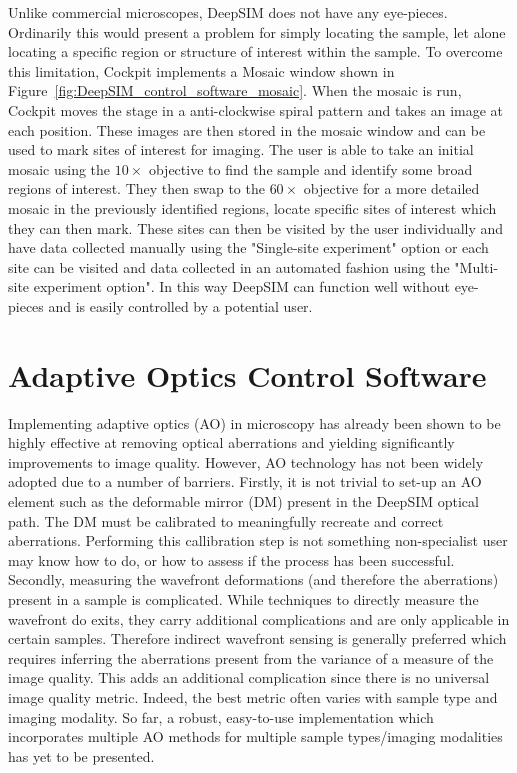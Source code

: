 Unlike commercial microscopes, DeepSIM does not have any eye-pieces. Ordinarily this would present a problem for simply locating the sample, let alone locating a specific region or structure of interest within the sample. To overcome this limitation, Cockpit implements a Mosaic window shown in Figure~\ref{fig:DeepSIM_control_software_mosaic}. When the mosaic is run, Cockpit moves the stage in a anti-clockwise spiral pattern and takes an image at each position. These images are then stored in the mosaic window and can be used to mark sites of interest for imaging. The user is able to take an initial mosaic using the $10\times$ objective to find the sample and identify some broad regions of interest. They then swap to the $60\times$ objective for a more detailed mosaic in the previously identified regions, locate specific sites of interest which they can then mark. These sites can then be visited by the user individually and have data collected manually using the "Single-site experiment" option or each site can be visited and data collected in an automated fashion using the "Multi-site experiment option". In this way DeepSIM can function well without eye-pieces and is easily controlled by a potential user.

\section{Adaptive Optics Control Software}
\label{sec:AOtools}

Implementing adaptive optics (AO) in microscopy has already been shown to be highly effective at removing optical aberrations and yielding significantly improvements to image quality.\cite{booth2014adaptive,girkin2009adaptive} However, AO technology has not been widely adopted due to a number of barriers. Firstly, it is not trivial to set-up an AO element such as the deformable mirror (DM) present in the DeepSIM optical path. The DM must be calibrated to meaningfully recreate and correct aberrations. Performing this callibration step is not something non-specialist user may know how to do, or how to assess if the process has been successful. Secondly, measuring the wavefront deformations (and therefore the aberrations) present in a sample is complicated. While techniques to directly measure the  wavefront do exits, they carry additional complications and are only applicable in certain samples.\cite{wang2014rapid,wang2015direct} Therefore indirect wavefront sensing is generally preferred which requires inferring the aberrations present from the variance of a measure of the image quality.\cite{rodriguez2018adaptive} This adds an additional complication since there is no universal image quality metric. Indeed, the best metric often varies with sample type and imaging modality.\cite{burke2015adaptive,booth2002adaptive,fienup2003aberration,debarre2008adaptive} So far, a robust, easy-to-use implementation which incorporates multiple AO methods for multiple sample types/imaging modalities has yet to be presented.\cite{ji2017adaptive}

